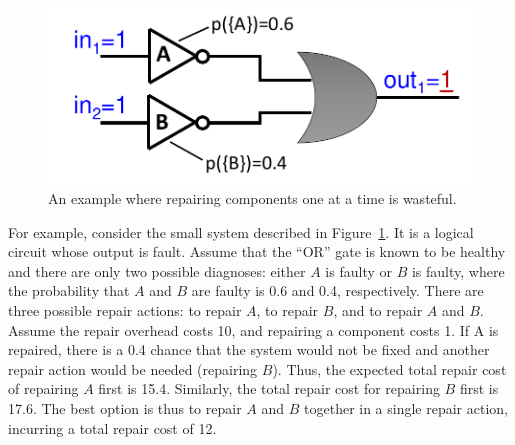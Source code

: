 \begin{figure}
\begin{center}
  \includegraphics[width=0.5\columnwidth]{simple-example.pdf}
  \caption{An example where repairing components one at a time is wasteful.}
  \label{fig:simple-example}
\end{center}
\end{figure}
%
%
For example, consider the small system described in Figure~\ref{fig:simple-example}. It is a logical circuit whose output is fault. Assume that the ``OR'' gate is known to be healthy and there are only two possible diagnoses: either $A$ is faulty or $B$ is faulty, where the probability that $A$ and $B$ are faulty is 0.6 and 0.4, respectively. There are three possible repair actions: to repair $A$, to repair $B$, and to repair $A$ and $B$.
Assume the repair overhead costs 10, and repairing a component costs 1. If A is repaired, there is a 0.4 chance that the system would not be fixed and another repair action would be needed (repairing $B$). Thus, the expected total repair cost of repairing $A$ first is 15.4. Similarly, the total repair cost for repairing $B$ first is 17.6. The best option is thus to repair $A$ and $B$ together in a  single repair action, incurring a total repair cost of 12.




